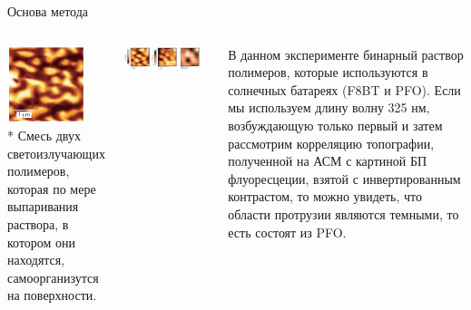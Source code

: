 \documentclass[9pt, compress, xcolor=table]{beamer}
\begin{document}
\begin{frame}{Основа метода}
\begin{columns}[c]
\column{5.5cm}
\begin{center}
\includegraphics[width=0.8\textwidth]{nfm34}
\\* Смесь двух светоизлучающих полимеров, которая по мере выпаривания раствора, в котором они находятся, самоорганизутся на поверхности.
\end{center}

\column{7cm}
\begin{center}
\includegraphics[width=0.9\textwidth]{nfm35}
\end{center}

В данном эксперименте бинарный раствор полимеров, которые используются в солнечных батареях (F8BT и PFO). Если мы используем длину волну 325 нм, возбуждающую только первый и затем рассмотрим корреляцию топографии, полученной на АСМ с картиной БП флуоресцеции, взятой с инвертированным контрастом, то можно увидеть, что области протрузии являются темными, то есть состоят из PFO. 

\end{columns}

\end{frame}
\end{document}
